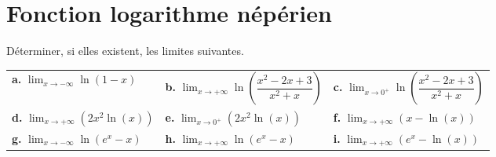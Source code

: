 \documentclass[11pt,fleqn, openany]{book} %
\begin{document}

\section*{Fonction logarithme népérien}


\begin{exercise}[topic=log03]Déterminer, si elles existent, les limites suivantes.

\renewcommand{\arraystretch}{2}
\begin{tabularx}{\linewidth}{XXX}
\textbf{a.} $\displaystyle\lim_{x \to -\infty} \ln(1-x)$ & \textbf{b.} $\displaystyle\lim_{x \to +\infty}\ln\left(\dfrac{x^2-2x+3}{x^2+x}\right)$ & \textbf{c.} $\displaystyle\lim_{x \to 0^+}\ln\left(\dfrac{x^2-2x+3}{x^2+x}\right)$ \\
\textbf{d.} $\displaystyle\lim_{x \to +\infty}(2x^2 \ln(x))$ & \textbf{e.} $\displaystyle\lim_{x \to 0^+}(2x^2 \ln(x))$ & \textbf{f.} $\displaystyle\lim_{x \to +\infty}(x-\ln(x))$ \\

\textbf{g.}  $\displaystyle\lim_{x \to -\infty}\ln(e^x-x)$ & \textbf{h.} $\displaystyle\lim_{x \to +\infty}\ln(e^x-x)$ & \textbf{i.} $\displaystyle\lim_{x \to +\infty} (e^x - \ln(x))$
\end{tabularx}
\end{exercise}
\end{document}
